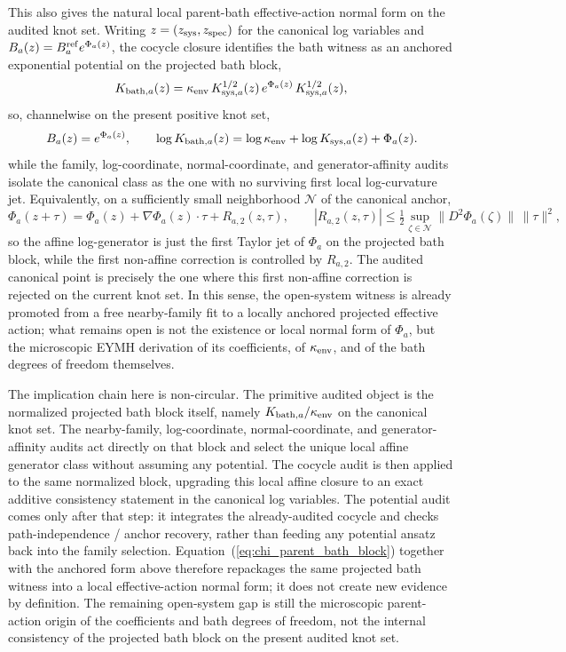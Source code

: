 \documentclass[aps,prd,onecolumn,notitlepage,nofootinbib,superscriptaddress,11pt,floatfix]{revtex4-2}
\begin{document}
This also gives the natural local parent-bath effective-action normal form on the audited knot set. Writing $z=(z_{\rm sys},z_{\rm spec})$ for the canonical log variables and $B_a(z)=B_a^{\rm ref} e^{\Phi_a(z)}$, the cocycle closure identifies the bath witness as an anchored exponential potential on the projected bath block,
\[
K_{{\rm bath},a}(z)=\kappa_{\rm env}\,K_{{\rm sys},a}^{1/2}(z)\,e^{\Phi_a(z)}\,K_{{\rm sys},a}^{1/2}(z),
\]
so, channelwise on the present positive knot set,
\[
B_a(z)=e^{\Phi_a(z)},
\qquad
\log K_{{\rm bath},a}(z)=\log \kappa_{\rm env}+\log K_{{\rm sys},a}(z)+\Phi_a(z).
\]
while the family, log-coordinate, normal-coordinate, and generator-affinity audits isolate the canonical class as the one with no surviving first local log-curvature jet. Equivalently, on a sufficiently small neighborhood $\mathcal N$ of the canonical anchor,
\[
\Phi_a(z+\tau)=\Phi_a(z)+\nabla\Phi_a(z)\!\cdot\!\tau+R_{a,2}(z,\tau),
\qquad
|R_{a,2}(z,\tau)|\le \tfrac12 \sup_{\zeta\in\mathcal N}\|D^2\Phi_a(\zeta)\|\,\|\tau\|^2,
\]
so the affine log-generator is just the first Taylor jet of $\Phi_a$ on the projected bath block, while the first non-affine correction is controlled by $R_{a,2}$. The audited canonical point is precisely the one where this first non-affine correction is rejected on the current knot set. In this sense, the open-system witness is already promoted from a free nearby-family fit to a locally anchored projected effective action; what remains open is not the existence or local normal form of $\Phi_a$, but the microscopic EYMH derivation of its coefficients, of $\kappa_{\rm env}$, and of the bath degrees of freedom themselves.

The implication chain here is non-circular. The primitive audited object is the normalized projected bath block itself, namely $K_{{\rm bath},a}/\kappa_{\rm env}$ on the canonical knot set. The nearby-family, log-coordinate, normal-coordinate, and generator-affinity audits act directly on that block and select the unique local affine generator class without assuming any potential. The cocycle audit is then applied to the same normalized block, upgrading this local affine closure to an exact additive consistency statement in the canonical log variables. The potential audit comes only after that step: it integrates the already-audited cocycle and checks path-independence / anchor recovery, rather than feeding any potential ansatz back into the family selection. Equation~(\ref{eq:chi_parent_bath_block}) together with the anchored form above therefore repackages the same projected bath witness into a local effective-action normal form; it does not create new evidence by definition. The remaining open-system gap is still the microscopic parent-action origin of the coefficients and bath degrees of freedom, not the internal consistency of the projected bath block on the present audited knot set.
\end{document}
